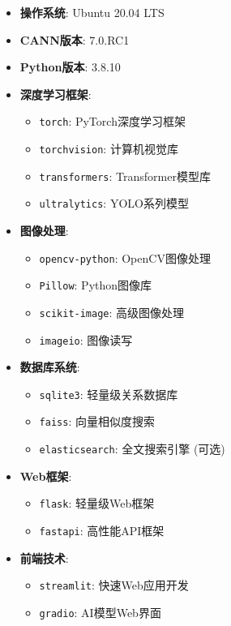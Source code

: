 \begin{itemize}
\tightlist
\item
  \textbf{操作系统}: Ubuntu 20.04 LTS
\item
  \textbf{CANN版本}: 7.0.RC1
\item
  \textbf{Python版本}: 3.8.10
\item
  \textbf{深度学习框架}:

  \begin{itemize}
  \tightlist
  \item
    \passthrough{\lstinline!torch!}: PyTorch深度学习框架
  \item
    \passthrough{\lstinline!torchvision!}: 计算机视觉库
  \item
    \passthrough{\lstinline!transformers!}: Transformer模型库
  \item
    \passthrough{\lstinline!ultralytics!}: YOLO系列模型
  \end{itemize}
\item
  \textbf{图像处理}:

  \begin{itemize}
  \tightlist
  \item
    \passthrough{\lstinline!opencv-python!}: OpenCV图像处理
  \item
    \passthrough{\lstinline!Pillow!}: Python图像库
  \item
    \passthrough{\lstinline!scikit-image!}: 高级图像处理
  \item
    \passthrough{\lstinline!imageio!}: 图像读写
  \end{itemize}
\item
  \textbf{数据库系统}:

  \begin{itemize}
  \tightlist
  \item
    \passthrough{\lstinline!sqlite3!}: 轻量级关系数据库
  \item
    \passthrough{\lstinline!faiss!}: 向量相似度搜索
  \item
    \passthrough{\lstinline!elasticsearch!}: 全文搜索引擎 (可选)
  \end{itemize}
\item
  \textbf{Web框架}:

  \begin{itemize}
  \tightlist
  \item
    \passthrough{\lstinline!flask!}: 轻量级Web框架
  \item
    \passthrough{\lstinline!fastapi!}: 高性能API框架
  \end{itemize}
\item
  \textbf{前端技术}:

  \begin{itemize}
  \tightlist
  \item
    \passthrough{\lstinline!streamlit!}: 快速Web应用开发
  \item
    \passthrough{\lstinline!gradio!}: AI模型Web界面
  \end{itemize}
\end{itemize}

